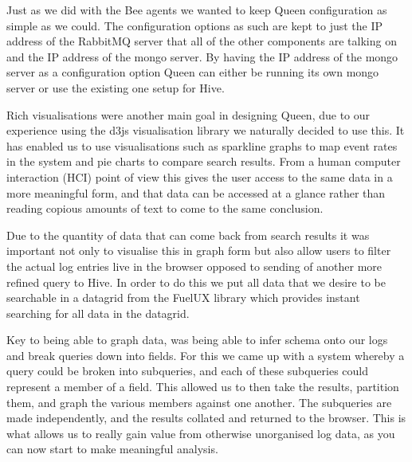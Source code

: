 Just as we did with the Bee agents we wanted to keep
Queen configuration as
simple as we could. The configuration options as such
are kept to just the IP
address of the RabbitMQ server that all of the other
components are talking on and
the IP address of the mongo server. By having the IP
address of the mongo server
as a configuration option Queen can either be running
its own mongo server or
use the existing one setup for Hive.

Rich visualisations were another main goal in designing
Queen, due to our
experience using the d3js\cite{d3} visualisation library we
naturally decided to use
this. It has enabled us to use visualisations such as
sparkline graphs to map
event rates in the system and pie charts to compare search
results. From a
human computer interaction (HCI) point of view this gives
the user access to the
same data in a more meaningful form, and that data can be
accessed at a glance
rather than reading copious amounts of text to come to the
same conclusion.

Due to the quantity of data that can come back from search
results it was
important not only to visualise this in graph form but
also allow users to
filter the actual log entries live in the browser opposed
to sending of another
more refined query to Hive. In order to do this we put all
data that we desire
to be searchable in a datagrid from the FuelUX\cite{fuelux} library
which provides instant
searching for all data in the datagrid.

Key to being able to graph data, was being able to infer
schema onto our logs and break queries down into fields. For
this we came up with a system whereby a query could be
broken into subqueries, and each of these subqueries could
represent a member of a field. This allowed us to then take
the results, partition them, and graph the various members
against one another. The subqueries are made independently,
and the results collated and returned to the browser. This
is what allows us to really gain value from otherwise
unorganised log data, as you can now start to make
meaningful analysis.

